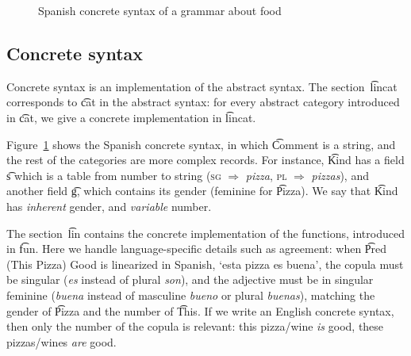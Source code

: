 \begin{figure}[h]
\begin{Shaded}
\begin{Highlighting}[]
  \FunctionTok{=}
      \FunctionTok{=}   \NormalTok{\{ } \OtherTok{=>}  \OtherTok{=>} 
       \FunctionTok{=} \FunctionTok{++} \FunctionTok{!}  \NormalTok{;} \FunctionTok{=}  \FunctionTok{=} 
    \FunctionTok{=}  \OtherTok{=>}  \NormalTok{; } \OtherTok{=>}  \NormalTok{\} ;}
    \FunctionTok{=}   \NormalTok{\{ } \OtherTok{=>} \FunctionTok{++}  \OtherTok{=>} \FunctionTok{++} 
\end{Highlighting}
\end{Shaded}
  \caption{Spanish concrete syntax of a \gf{} grammar about food}
\label{fig:spanish}
\end{figure}

\subsection{Concrete syntax}
\label{concrete_spanish_foods}
Concrete syntax is an implementation of the abstract syntax.
The section~\t{lincat} corresponds to \t{cat} in the abstract syntax:
for every abstract category introduced in \t{cat}, we give a concrete
implementation in \t{lincat}.


Figure~\ref{fig:spanish} shows the Spanish concrete
syntax, in which \t{Comment} is a string, and the rest of the
categories are more complex records. For instance, \t{Kind} has a
field \t{s} which is a table from number to string (\textsc{sg} $\Rightarrow$
\emph{pizza}, \textsc{pl} $\Rightarrow$ \emph{pizzas}), and another
field \t{g}, which contains its gender (feminine for \t{Pizza}). We
say that \t{Kind} has \emph{inherent} gender, and \emph{variable} number. 

The section~\t{lin} contains the concrete implementation of the
functions, introduced in \t{fun}. Here we handle
language-specific details such as agreement: when \t{Pred (This Pizza)
  Good} is linearized in Spanish, `esta pizza es buena', the copula must be singular
(\emph{es} instead of plural \emph{son}), and the adjective must be in singular
feminine (\emph{buena} instead of masculine \emph{bueno} or plural
\emph{buenas}), matching the gender of \t{Pizza} and the number of \t{This}. 
If we write an English concrete syntax, then only the number of the copula is
relevant: this pizza/wine \emph{is} good, these pizzas/wines \emph{are} good.


